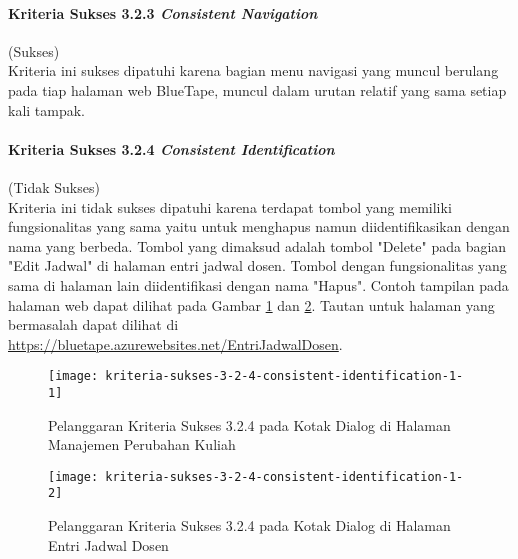 \paragraph{Kriteria Sukses 3.2.3 \textit{Consistent Navigation}}
\label{par:kepatuhan_bluetape_kriteria_sukses_3.2.3}
(Sukses)\\

Kriteria ini sukses dipatuhi karena bagian menu navigasi yang muncul berulang pada tiap halaman web BlueTape, muncul dalam urutan relatif yang sama setiap kali tampak.

\paragraph{Kriteria Sukses 3.2.4 \textit{Consistent Identification}}
\label{par:kepatuhan_bluetape_kriteria_sukses_3.2.4}
(Tidak Sukses)\\

Kriteria ini tidak sukses dipatuhi karena terdapat tombol yang memiliki fungsionalitas yang sama yaitu untuk menghapus namun diidentifikasikan dengan nama yang berbeda. Tombol yang dimaksud adalah tombol "Delete" pada bagian "Edit Jadwal" di halaman entri jadwal dosen. Tombol dengan fungsionalitas yang sama di halaman lain diidentifikasi dengan nama "Hapus". Contoh tampilan pada halaman web dapat dilihat pada Gambar \ref{fig:3.2.4_consistent_identification_1} dan \ref{fig:3.2.4_consistent_identification_2}. Tautan untuk halaman yang bermasalah dapat dilihat di \url{https://bluetape.azurewebsites.net/EntriJadwalDosen}.

\begin{figure}[H]
    \centering  
    \texttt{[image: kriteria-sukses-3-2-4-consistent-identification-1-1]}  
    \caption[Pelanggaran Kriteria Sukses 3.2.4 pada Kotak Dialog di Halaman Manajemen Perubahan Kuliah]{Pelanggaran Kriteria Sukses 3.2.4 pada Kotak Dialog di Halaman Manajemen Perubahan Kuliah}
    \label{fig:3.2.4_consistent_identification_1}  
\end{figure}

\begin{figure}[H]
    \centering  
    \texttt{[image: kriteria-sukses-3-2-4-consistent-identification-1-2]}  
    \caption[Pelanggaran Kriteria Sukses 3.2.4 pada Kotak Dialog di Halaman Entri Jadwal Dosen]{Pelanggaran Kriteria Sukses 3.2.4 pada Kotak Dialog di Halaman Entri Jadwal Dosen}
    \label{fig:3.2.4_consistent_identification_2}  
\end{figure}

